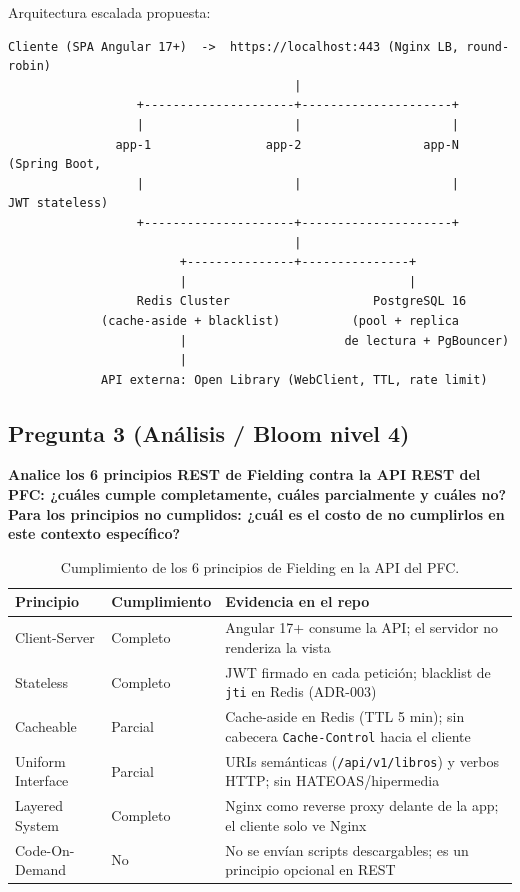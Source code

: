 \documentclass[12pt,a4paper]{article}
\begin{document}
Arquitectura escalada propuesta:

\begin{lstlisting}[basicstyle=\ttfamily\footnotesize]
Cliente (SPA Angular 17+)  ->  https://localhost:443 (Nginx LB, round-robin)
                                        |
                  +---------------------+---------------------+
                  |                     |                     |
               app-1                app-2                 app-N   (Spring Boot,
                  |                     |                     |      JWT stateless)
                  +---------------------+---------------------+
                                        |
                        +---------------+---------------+
                        |                               |
                  Redis Cluster                    PostgreSQL 16
             (cache-aside + blacklist)          (pool + replica
                        |                      de lectura + PgBouncer)
                        |
             API externa: Open Library (WebClient, TTL, rate limit)
\end{lstlisting}

\subsection*{Pregunta 3 (Análisis / Bloom nivel 4)}

\textbf{Analice los 6 principios REST de Fielding contra la API REST del PFC: ¿cuáles
cumple completamente, cuáles parcialmente y cuáles no? Para los principios no cumplidos:
¿cuál es el costo de no cumplirlos en este contexto específico?}

\begin{table}[H]
\centering
\caption{Cumplimiento de los 6 principios de Fielding en la API del PFC.}
\label{tab:fielding-annexo}
\footnotesize
\setlength{\tabcolsep}{4pt}
\renewcommand{\arraystretch}{1.3}
\begin{tabularx}{\textwidth}{lXX}
\toprule
Principio & Cumplimiento & Evidencia en el repo \\
\midrule
Client-Server & Completo & Angular 17+ consume la API; el servidor no renderiza la vista \\
Stateless & Completo & JWT firmado en cada petición; blacklist de \texttt{jti} en Redis (ADR-003) \\
Cacheable & Parcial & Cache-aside en Redis (TTL 5 min); sin cabecera \texttt{Cache-Control} hacia el cliente \\
Uniform Interface & Parcial & URIs semánticas (\texttt{/api/v1/libros}) y verbos HTTP; sin HATEOAS/hipermedia \\
Layered System & Completo & Nginx como reverse proxy delante de la app; el cliente solo ve Nginx \\
Code-On-Demand & No & No se envían scripts descargables; es un principio opcional en REST \\
\bottomrule
\end{tabularx}
\end{table}
\end{document}
